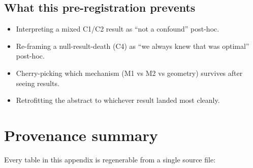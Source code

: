 \documentclass{article}
\begin{document}
\subsection{What this pre-registration prevents}

\begin{itemize}
  \item Interpreting a mixed C1/C2 result as ``not a confound'' post-hoc.
  \item Re-framing a null-result-death (C4) as ``we always knew that was optimal'' post-hoc.
  \item Cherry-picking which mechanism (M1 vs M2 vs geometry) survives after seeing results.
  \item Retrofitting the abstract to whichever result landed most cleanly.
\end{itemize}

\section{Provenance summary}
\label{app:provenance}

Every table in this appendix is regenerable from a single source file:
\end{document}
